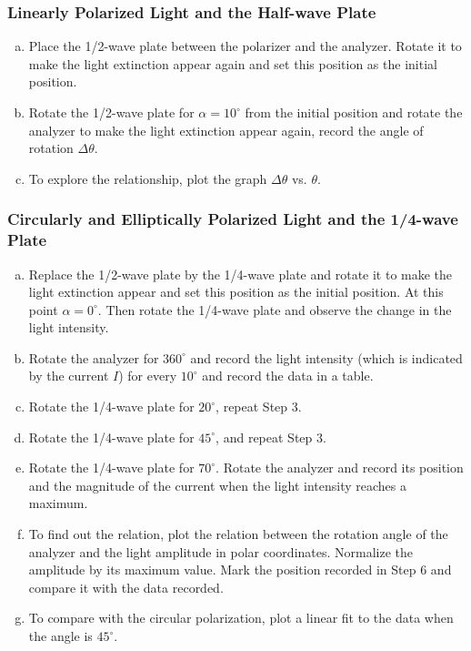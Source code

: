 \documentclass[a4paper]{article}
\begin{document}
\subsubsection{Linearly Polarized Light and the Half-wave Plate}
\begin{enumerate}[a.]
	\item Place the 1/2-wave plate between the polarizer and the analyzer. Rotate it to make the light extinction appear again and set this position as the initial position.
	\item Rotate the 1/2-wave plate for $\alpha = 10^\circ$ from the initial position and rotate the analyzer to make the light extinction appear again, record the angle of rotation $\Delta\theta$.
	\item To explore the relationship, plot the graph $\Delta\theta$ vs. $\theta$.
\end{enumerate}

\subsubsection{Circularly and Elliptically Polarized Light and the 1/4-wave Plate}
\begin{enumerate}[a.]
	\item Replace the 1/2-wave plate by the 1/4-wave plate and rotate it to make the light extinction appear and set this position as the initial position. At this point $\alpha = 0^\circ$. Then rotate the 1/4-wave plate and observe the change in the light intensity.
	\item Rotate the analyzer for $360^\circ$ and record the light intensity (which is indicated by the current $I$) for every $10^\circ$ and record the data in a table.
	\item Rotate the 1/4-wave plate for $20^\circ$, repeat Step 3.
	\item Rotate the 1/4-wave plate for $45^\circ$, and repeat Step 3.
	\item Rotate the 1/4-wave plate for $70^\circ$. Rotate the analyzer and record its position and the magnitude of the current when the light intensity reaches a maximum.
	\item To find out the relation, plot the relation between the rotation angle of the analyzer and the light amplitude in polar coordinates. Normalize the amplitude by its maximum value. Mark the position recorded in Step 6 and compare it with the data recorded.
	\item To compare with the circular polarization, plot a linear fit to the data when the angle is $45^\circ$.
\end{enumerate}
\end{document}
